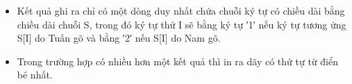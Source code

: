 \begin{itemize}
	\item     Kết quả ghi ra chỉ có một dòng duy nhất chứa chuỗi ký tự có chiều dài bằng chiều dài chuỗi S, trong đó ký tự thứ I sẽ bằng ký tự ′1′ nếu ký tự tương ứng S[I] do Tuấn gõ và bằng ′2′ nếu S[I] do Nam gõ.   
	\item     Trong trường hợp có nhiều hơn một kết quả thì in ra dãy có thứ tự từ điển bé nhất.   
\end{itemize}